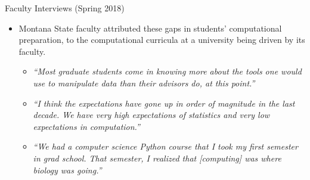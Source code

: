 \documentclass[10pt,ignorenonframetext,]{beamer}
\providecommand{\tightlist}{%
  \setlength{\itemsep}{0pt}\setlength{\parskip}{0pt}}
\begin{document}
\begin{frame}{Faculty Interviews (Spring 2018)}

\begin{itemize}[<+->]
\item
  Montana State faculty attributed these gaps in students' computational
  preparation, to the computational curricula at a university being
  driven by its faculty.

  \begin{itemize}[<+->]
  \tightlist
  \item
    \emph{``Most graduate students come in knowing more about the tools
    one would use to manipulate data than their advisors do, at this
    point.''}\\
  \item
    \emph{``I think the expectations have gone up in order of magnitude
    in the last decade. We have very high expectations of statistics and
    very low expectations in computation.''}
  \item
    \emph{``We had a computer science Python course that I took my first
    semester in grad school. That semester, I realized that
    {[}computing{]} was where biology was going.''}
  \end{itemize}
\end{itemize}

\end{frame}
\end{document}
